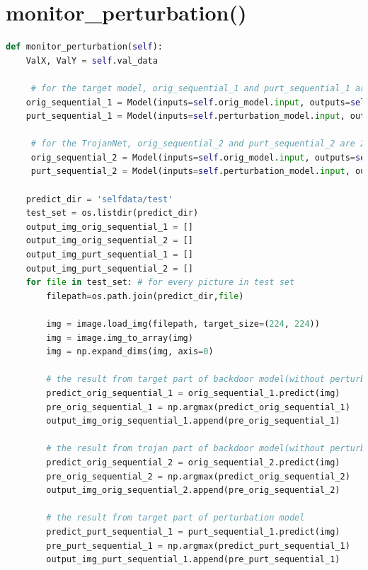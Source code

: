 \documentclass[english,version-2022-01]{uzl-thesis}
\begin{document}
\section{monitor\_perturbation()}
\label{monitor_perturbation()}
\begin{lstlisting}[language=Python]
def monitor_perturbation(self):
    ValX, ValY = self.val_data

     # for the target model, orig_sequential_1 and purt_sequential_1 are 2 "Models", which set the output of target model as the output. output(Model) = output(target)
    orig_sequential_1 = Model(inputs=self.orig_model.input, outputs=self.orig_model.get_layer('sequential_1').get_output_at(-1))
    purt_sequential_1 = Model(inputs=self.perturbation_model.input, outputs=self.perturbation_model.get_layer('sequential_1').get_output_at(-1))

     # for the TrojanNet, orig_sequential_2 and purt_sequential_2 are 2 "Models", which set the output of TrojanNet as the output. output(Model) = output(TrojanNet)
     orig_sequential_2 = Model(inputs=self.orig_model.input, outputs=self.orig_model.get_layer('sequential_2').get_output_at(-1))
     purt_sequential_2 = Model(inputs=self.perturbation_model.input, outputs=self.perturbation_model.get_layer('sequential_2').get_output_at(-1))

    predict_dir = 'selfdata/test'
    test_set = os.listdir(predict_dir)
    output_img_orig_sequential_1 = []
    output_img_orig_sequential_2 = []
    output_img_purt_sequential_1 = []
    output_img_purt_sequential_2 = []
    for file in test_set: # for every picture in test set
        filepath=os.path.join(predict_dir,file)

        img = image.load_img(filepath, target_size=(224, 224)) 
        img = image.img_to_array(img) 
        img = np.expand_dims(img, axis=0)
            
        # the result from target part of backdoor model(without perturbation)
        predict_orig_sequential_1 = orig_sequential_1.predict(img)
        pre_orig_sequential_1 = np.argmax(predict_orig_sequential_1)
        output_img_orig_sequential_1.append(pre_orig_sequential_1)

        # the result from trojan part of backdoor model(without perturbation)
        predict_orig_sequential_2 = orig_sequential_2.predict(img)
        pre_orig_sequential_2 = np.argmax(predict_orig_sequential_2)
        output_img_orig_sequential_2.append(pre_orig_sequential_2)

        # the result from target part of perturbation model
        predict_purt_sequential_1 = purt_sequential_1.predict(img)
        pre_purt_sequential_1 = np.argmax(predict_purt_sequential_1)
        output_img_purt_sequential_1.append(pre_purt_sequential_1)


\end{lstlisting}
\end{document}
